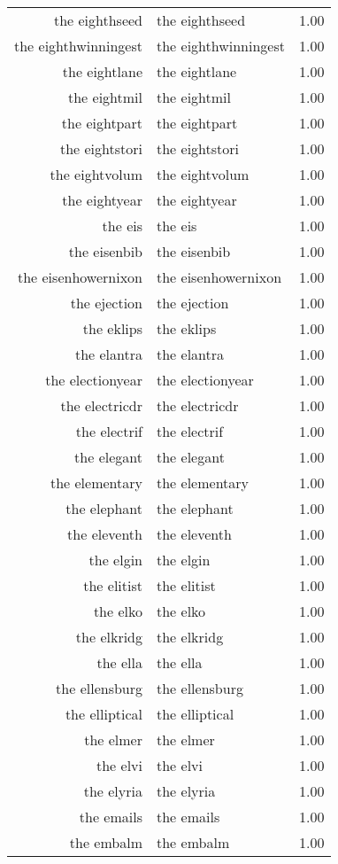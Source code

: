 \begin{table}[ht]
\begin{tabular}{rlr}
  the eighthseed & the eighthseed & 1.00 \\ 
  the eighthwinningest & the eighthwinningest & 1.00 \\ 
  the eightlane & the eightlane & 1.00 \\ 
  the eightmil & the eightmil & 1.00 \\ 
  the eightpart & the eightpart & 1.00 \\ 
  the eightstori & the eightstori & 1.00 \\ 
  the eightvolum & the eightvolum & 1.00 \\ 
  the eightyear & the eightyear & 1.00 \\ 
  the eis & the eis & 1.00 \\ 
  the eisenbib & the eisenbib & 1.00 \\ 
  the eisenhowernixon & the eisenhowernixon & 1.00 \\ 
  the ejection & the ejection & 1.00 \\ 
  the eklips & the eklips & 1.00 \\ 
  the elantra & the elantra & 1.00 \\ 
  the electionyear & the electionyear & 1.00 \\ 
  the electricdr & the electricdr & 1.00 \\ 
  the electrif & the electrif & 1.00 \\ 
  the elegant & the elegant & 1.00 \\ 
  the elementary & the elementary & 1.00 \\ 
  the elephant & the elephant & 1.00 \\ 
  the eleventh & the eleventh & 1.00 \\ 
  the elgin & the elgin & 1.00 \\ 
  the elitist & the elitist & 1.00 \\ 
  the elko & the elko & 1.00 \\ 
  the elkridg & the elkridg & 1.00 \\ 
  the ella & the ella & 1.00 \\ 
  the ellensburg & the ellensburg & 1.00 \\ 
  the elliptical & the elliptical & 1.00 \\ 
  the elmer & the elmer & 1.00 \\ 
  the elvi & the elvi & 1.00 \\ 
  the elyria & the elyria & 1.00 \\ 
  the emails & the emails & 1.00 \\ 
  the embalm & the embalm & 1.00 \\ 

\end{tabular}
\end{table}
